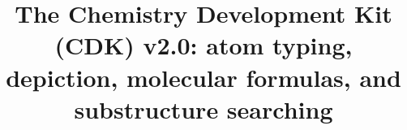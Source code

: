 \documentclass[doublespacing]{bmcart}
\begin{document}
\begin{frontmatter}

\begin{fmbox}

%

\title{The Chemistry Development Kit (CDK) v2.0: atom typing, depiction, molecular formulas, and substructure searching}

\author[
   addressref={um},                                 %
   email={egon.willighagen@maastrichtuniversity.nl}
]{ }
\author[
   addressref={nm},
   email={john.may@cantab.net}
]{ }
\author[
   addressref={uppsala},
   email={jonathan.alvarsson@farmbio.uu.se}
]{ }
\author[
   addressref={uppsala},
   email={berg.arvid@gmail.com}
]{ }
\author[
   addressref={azg},                                %
   email={Lars.A.Carlsson@astrazeneca.com}
]{~}
\author[
   addressref={idea},
   email={jeliazkova.nina@gmail.com}
]{~}
\author[
   addressref={leicester},
   email={shk12@le.ac.uk}
]{ }
\author[
   addressref={wi_mit},                             %
   email={pluskal@wi.mit.edu}
]{~}
\author[
   addressref={miquel},                             %
   email={mrojas@qca.es}
]{~}
\author[
   addressref={uppsala},
   email={ola.spjuth@farmbio.uu.se}
]{ }
\author[
   addressref={gilleain},                           %
   email={gilleain.torrance@gmail.com}
]{ }
\author[
   addressref={um},
   email={chris.evelo@maastrichtuniversity.nl}
]{~}
\author[
   addressref={nih},
   email={guhar@mail.nih.gov}
]{ }
\author[
   addressref={ebi},
   email={steinbeck@ebi.ac.uk}
]{~}


\end{fmbox}
\end{frontmatter}
\end{document}
